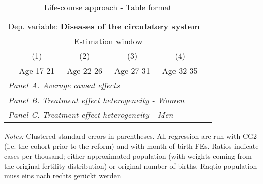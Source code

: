  \begin{table}[H] \centering \begin{threeparttable} \caption{Life-course approach - Table format} {\def\sym#1{\ifmmode^{#1}\else\(^{#1}\)\fi} \begin{tabular}{l*{5}{c}} \toprule \multicolumn{5}{l}{Dep. variable: \textbf{Diseases of the circulatory system}} \\ & \multicolumn{4}{c}{Estimation window} \\ \cmidrule(lr){2-5}
            &\multicolumn{1}{c}{(1)}&\multicolumn{1}{c}{(2)}&\multicolumn{1}{c}{(3)}&\multicolumn{1}{c}{(4)}\\
            &\multicolumn{1}{c}{Age 17-21}&\multicolumn{1}{c}{Age 22-26}&\multicolumn{1}{c}{Age 27-31}&\multicolumn{1}{c}{Age 32-35}\\
\midrule
 \multicolumn{5}{l}{\emph{Panel A. Average causal effects}} \\      \midrule\multicolumn{5}{l}{\emph{Panel B. Treatment effect heterogeneity - Women}} \\      \midrule\multicolumn{5}{l}{\emph{Panel C. Treatment effect heterogeneity - Men}} \\      
\bottomrule \end{tabular} } \begin{tablenotes} \item \scriptsize \emph{Notes:} Clustered standard errors in parentheses. All regression are run with CG2 (i.e. the cohort prior to the reform) and with month-of-birth FEs. Ratios indicate cases per thousand; either approximated population (with weights coming from the original fertility distribution) or original number of births. Raqtio population muss eins nach rechts gerückt werden \end{tablenotes} \end{threeparttable} \end{table} 
